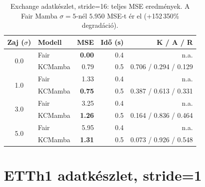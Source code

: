 \begin{table}[H]
    \centering
    \small
    \begin{tabular}{|c|l|r|r|r|}
        \hline
        \textbf{Zaj ($\sigma$)} & \textbf{Modell} & \textbf{MSE} & \textbf{Idő (s)} & \textbf{K / A / R} \\
        \hline\hline
        \multirow{2}{*}{0.0}
            & Fair      & \textbf{0.00} & 0.4 & n.a. \\
            & KCMamba & 0.79 & 0.5 & 0.706 / 0.294 / 0.129 \\
        \hline
        \multirow{2}{*}{1.0}
            & Fair      & 1.33 & 0.4 & n.a. \\
            & KCMamba & \textbf{0.75} & 0.5 & 0.387 / 0.613 / 0.331 \\
        \hline
        \multirow{2}{*}{3.0}
            & Fair      & 3.25 & 0.4 & n.a. \\
            & KCMamba & \textbf{1.26} & 0.5 & 0.164 / 0.836 / 0.464 \\
        \hline
        \multirow{2}{*}{5.0}
            & Fair      & 5.95 & 0.4 & n.a. \\
            & KCMamba & \textbf{1.31} & 0.5 & 0.073 / 0.926 / 0.548 \\
        \hline
    \end{tabular}
    \caption{Exchange adatkészlet, stride=16: teljes MSE eredmények.
             A Fair Mamba $\sigma=5$-nél $5.950$ MSE-t ér el (+152\,350\% degradáció).}
    \label{tab:full_exchange_s16}
\end{table}

\section{ETTh1 adatkészlet, stride=1}

